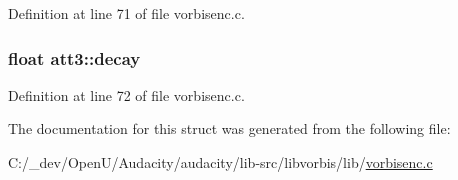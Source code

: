 Definition at line 71 of file vorbisenc.\+c.

\subsubsection[{\texorpdfstring{decay}{decay}}]{\setlength{\rightskip}{0pt plus 5cm}float att3\+::decay}\hypertarget{structatt3_a9149df466d618da5dde12351152ecab4}{}\label{structatt3_a9149df466d618da5dde12351152ecab4}


Definition at line 72 of file vorbisenc.\+c.



The documentation for this struct was generated from the following file\+:\begin{DoxyCompactItemize}
\item 
C\+:/\+\_\+dev/\+Open\+U/\+Audacity/audacity/lib-\/src/libvorbis/lib/\hyperlink{vorbisenc_8c}{vorbisenc.\+c}\end{DoxyCompactItemize}
